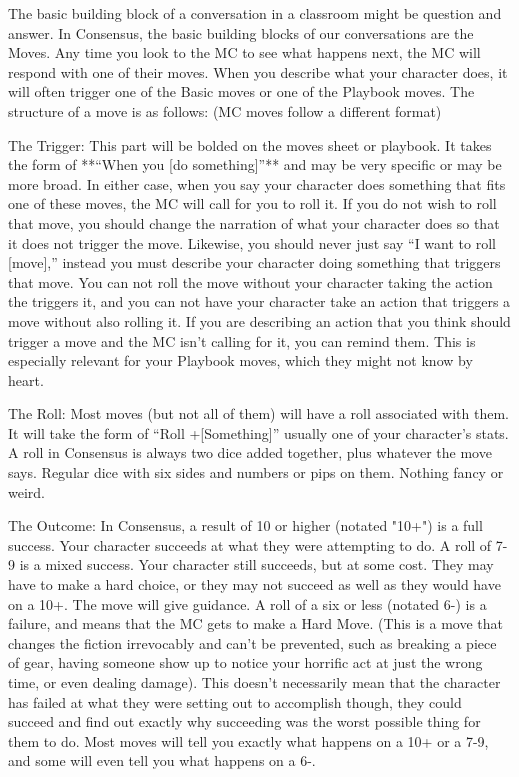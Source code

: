 \documentclass[
  oneside,
  statementpaper,
  9pt]{memoir}
\begin{document}
\begin{Player}

The basic building block of a conversation in a classroom might be question and answer. In Consensus, the basic building blocks of our conversations are the Moves. Any time you look to the MC to see what happens next, the MC will respond with one of their moves. When you describe what your character does, it will often trigger one of the Basic moves or one of the Playbook moves. The structure of a move is as follows: (MC moves follow a different format)

The Trigger: This part will be bolded on the moves sheet or playbook. It takes the form of **“When you [do something]”** and may be very specific or may be more broad. In either case, when you say your character does something that fits one of these moves, the MC will call for you to roll it. If you do not wish to roll that move, you should change the narration of what your character does so that it does not trigger the move. Likewise, you should never just say “I want to roll [move],” instead you must describe your character doing something that triggers that move. You can not roll the move without your character taking the action the triggers it, and you can not have your character take an action that triggers a move without also rolling it. If you are describing an action that you think should trigger a move and the MC isn't calling for it, you can remind them. This is especially relevant for your Playbook moves, which they might not know by heart.

The Roll: Most moves (but not all of them) will have a roll associated with them. It will take the form of “Roll +[Something]” usually one of your character’s stats. A roll in Consensus is always two dice added together, plus whatever the move says. Regular dice with six sides and numbers or pips on them. Nothing fancy or weird.

The Outcome: In Consensus, a result of 10 or higher (notated "10+") is a full success. Your character succeeds at what they were attempting to do. A roll of 7-9 is a mixed success. Your character still succeeds, but at some cost. They may have to make a hard choice, or they may not succeed as well as they would have on a 10+. The move will give guidance. A roll of a six or less (notated 6-) is a failure, and means that the MC gets to make a Hard Move. (This is a move that changes the fiction irrevocably and can’t be prevented, such as breaking a piece of gear, having someone show up to notice your horrific act at just the wrong time, or even dealing damage). This doesn’t necessarily mean that the character has failed at what they were setting out to accomplish though, they could succeed and find out exactly why succeeding was the worst possible thing for them to do. Most moves will tell you exactly what happens on a 10+ or a 7-9, and some will even tell you what happens on a 6-.

\end{Player}
\end{document}
